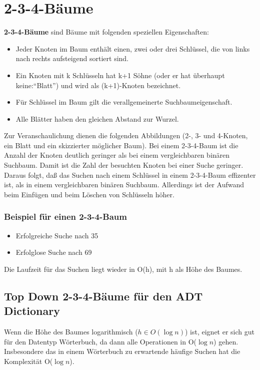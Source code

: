 \section{2-3-4-Bäume}
\begin{definition}[2-3-4-Bäume]
\textbf{2-3-4-Bäume} sind Bäume mit folgenden speziellen Eigenschaften:
\begin{itemize}
				\item Jeder Knoten im Baum enthält einen, zwei oder drei Schlüssel, 
							die von links nach rechts aufsteigend sortiert sind.		
				\item Ein Knoten mit k Schlüsseln hat k+1 Söhne (oder er hat überhaupt keine:``Blatt'') und wird als
							 (k+1)-Knoten bezeichnet.
				\item Für Schlüssel im Baum gilt die verallgemeinerte Suchbaumeigenschaft.
				\item Alle Blätter haben den gleichen Abstand zur Wurzel.	
			\end{itemize}
\end{definition}
Zur Veranschaulichung dienen die folgenden Abbildungen (2-, 3- und 4-Knoten, ein Blatt und ein skizzierter möglicher Baum).
			 	\centering		
				\centering
	 			\centering
		Bei einem 2-3-4-Baum ist die Anzahl der Knoten deutlich geringer als bei
		einem vergleichbaren binären Suchbaum. Damit ist die Zahl der besuchten 
		Knoten bei einer Suche geringer. Daraus folgt, daß das Suchen nach einem
		Schlüssel in einem 2-3-4-Baum effizenter ist, als in einem vergleichbaren binären Suchbaum.
		Allerdings ist der Aufwand beim Einfügen und beim Löschen von Schlüsseln höher.
\subsubsection{Beispiel für einen 2-3-4-Baum}
		\centering
		\begin{itemize}
			\item Erfolgreiche Suche nach 35
			\item Erfolglose Suche nach 69
		\end{itemize}
		Die Laufzeit für das Suchen liegt wieder in O(h), mit h als Höhe des Baumes.
\subsection{Top Down 2-3-4-Bäume für den ADT Dictionary}

Wenn die Höhe des Baumes logarithmisch ($h \in O(\log n)$) ist, eignet er sich gut für den Datentyp
Wörterbuch, da dann alle Operationen in O($\log n$) gehen. Insbesondere das in einem Wörterbuch zu erwartende häufige Suchen hat
die Komplexität O($\log n$).	

